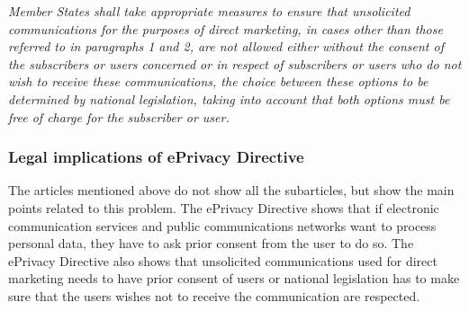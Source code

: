 \documentclass[11pt]{article}
\newcommand{\ePD}{ePrivacy Directive }
\begin{document}
\begin{itemize}
		\emph{Member States shall take appropriate measures to ensure that unsolicited communications for the purposes of direct marketing, in cases other than those referred to in paragraphs 1 and 2, are not allowed either without the consent of the subscribers or users concerned or in respect of subscribers or users who do not wish to receive these communications, the choice between these options to be determined by national legislation, taking into account that both options must be free of charge for the subscriber or user.}
\end{itemize}

\subsubsection{Legal implications of \ePD}

The articles mentioned above do not show all the subarticles, but show the main points related to this problem. The \ePD shows that if electronic communication services and public communications networks want to process personal data, they have to ask prior consent from the user to do so. The \ePD also shows that unsolicited communications used for direct marketing needs to have prior consent of users or national legislation has to make sure that the users wishes not to receive the communication are respected.
\end{document}

